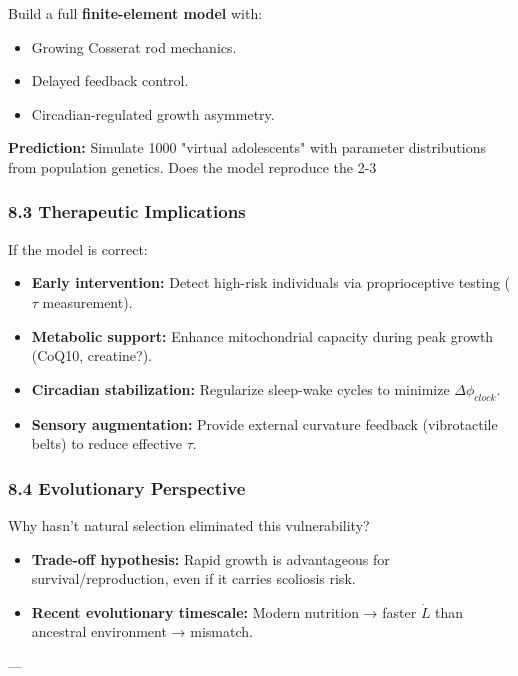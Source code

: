 \documentclass[11pt,a4paper]{article}
\begin{document}
Build a full \textbf{finite-element model} with:

\begin{itemize}
\item Growing Cosserat rod mechanics.
\item Delayed feedback control.
\item Circadian-regulated growth asymmetry.
\end{itemize}

\textbf{Prediction:} Simulate 1000 "virtual adolescents" with parameter distributions from population genetics. Does the model reproduce the 2-3%

\subsubsection{8.3 Therapeutic Implications}

If the model is correct:

\begin{itemize}
\item \textbf{Early intervention:} Detect high-risk individuals via proprioceptive testing ($\tau$ measurement).
\item \textbf{Metabolic support:} Enhance mitochondrial capacity during peak growth (CoQ10, creatine?).
\item \textbf{Circadian stabilization:} Regularize sleep-wake cycles to minimize $\Delta \phi_{clock}$.
\item \textbf{Sensory augmentation:} Provide external curvature feedback (vibrotactile belts) to reduce effective $\tau$.
\end{itemize}

\subsubsection{8.4 Evolutionary Perspective}

Why hasn't natural selection eliminated this vulnerability?

\begin{itemize}
\item \textbf{Trade-off hypothesis:} Rapid growth is advantageous for survival/reproduction, even if it carries scoliosis risk.
\item \textbf{Recent evolutionary timescale:} Modern nutrition → faster $\dot{L}$ than ancestral environment → mismatch.
\end{itemize}

---
\end{document}
